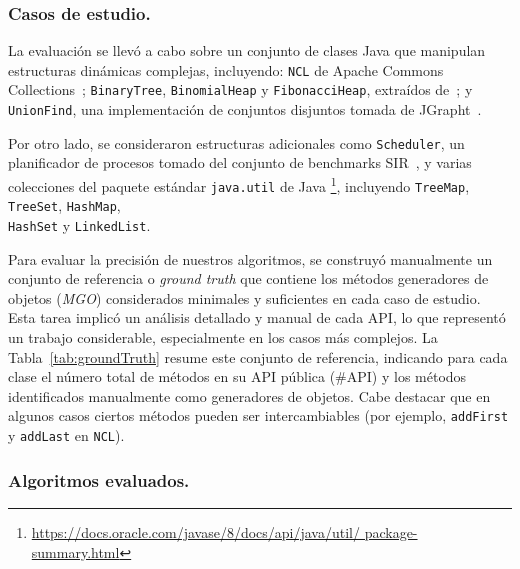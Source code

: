 \subsubsection{Casos de estudio.}


La evaluación se llevó a cabo sobre un conjunto de clases Java 
 que manipulan estructuras dinámicas complejas,
incluyendo: \verb"NCL" de Apache Commons Collections~\cite{apache};
\verb"BinaryTree", \verb"BinomialHeap" y \verb"FibonacciHeap", extraídos
de~\cite{Visser:2006}; y \verb"UnionFind", una implementación de conjuntos
disjuntos tomada de JGrapht~\cite{jgrapht}.

Por otro lado, se consideraron estructuras adicionales como \verb"Scheduler",
un planificador de procesos tomado del conjunto de benchmarks SIR~\cite{sir},
y varias colecciones del paquete estándar \verb"java.util" de Java%
\footnote{\url{https://docs.oracle.com/javase/8/docs/api/java/util/
package-summary.html}}, incluyendo \verb"TreeMap", \verb"TreeSet",
\verb"HashMap",\\
 \verb"HashSet" y \verb"LinkedList". 



Para evaluar la precisión de nuestros algoritmos, se construyó manualmente un
conjunto de referencia o \emph{ground truth} que contiene los métodos
generadores de objetos (\emph{MGO}) considerados minimales y suficientes en cada caso de estudio. Esta
tarea implicó un análisis detallado y manual de cada API, lo que representó un
trabajo considerable, especialmente en los casos más complejos. La
Tabla~\ref{tab:groundTruth} resume este conjunto de referencia, indicando para
cada clase el número total de métodos en su API pública (\#API) y los métodos
identificados manualmente como generadores de objetos. Cabe destacar que en algunos
casos ciertos métodos pueden ser intercambiables (por ejemplo,
\texttt{addFirst} y \texttt{addLast} en \texttt{NCL}).


\subsubsection{Algoritmos evaluados.}


